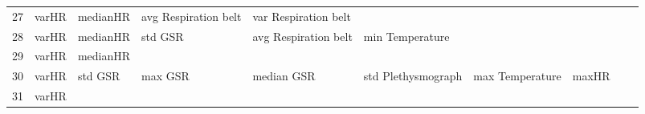 \begin{landscape}
\begin{table}[]
\begin{tabular}{l|llllllll}
27       & varHR                   & medianHR              & avg Respiration belt    & var Respiration belt    &                         &                       &                      &          &                      &        \\
28       & varHR                   & medianHR              & std GSR                 & avg Respiration belt    & min Temperature         &                       &                      &          &                      &        \\
29       & varHR                   & medianHR              &                         &                         &                         &                       &                      &          &                      &        \\
30       & varHR                   & std GSR               & max GSR                 & median GSR              & std Plethysmograph      & max Temperature       & maxHR                &          &                      &        \\
31       & varHR                   &                       &                         &                         &                         &                       &                      &          &                      &        \\
\end{tabular}
\end{table}
\end{landscape}
\clearpage

